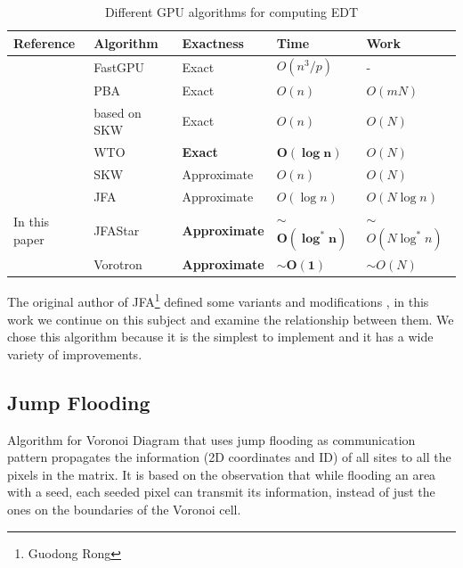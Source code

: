 \documentclass[format=acmsmall,screen,review,authordraft,nonacm]{acmart}
\newcommand{\ourjfasingle}{JFAStar}
\newcommand{\ourjfa}{Vorotron} %
\begin{document}
\begin{table}[H] \centering
\begin{tabular}{@{}lllll@{}}
\toprule
\textbf{Reference}                & \textbf{Algorithm}    & \textbf{Exactness}
	& \textbf{Time}         & \textbf{Work}         \\ \midrule
\citep{de2017fast}       & FastGPU      & Exact       & $O(n^3/p)$   & -            \\
\citep{cao2010parallel}  & PBA          & Exact       & $O(n)$       & $O(mN)$      \\
\citep{honda2017simple}  & based on SKW & Exact       & $O(n)$       & $O(N)$       \\
\citep{manduhu2019work}  & WTO          & \cellcolor{blue!25}\textbf{Exact}&
	\cellcolor{blue!25}$\mathbf{O(\log n)}$  & $O(N)$       \\
\citep{schneider2009gpu} & SKW          & Approximate & $O(n)$       & $O(N)$       \\
\citep{rong2006jump}     & JFA          & Approximate & $O(\log n)$  & $O(N\log n)$ \\ \bottomrule
In this paper            & \ourjfasingle&
	\cellcolor{blue!25}\textbf{Approximate} &
	\cellcolor{blue!25}$\sim$$\mathbf{O(\log^{\ast} n)}$ & $\sim$$O(N\log^{\ast} n)$ \\
                         & \ourjfa      &
	\cellcolor{blue!25}\textbf{Approximate} &
	\cellcolor{blue!25}$\sim$$\mathbf{O(1)}$ & $\sim$$O(N)$ \\
\bottomrule
\end{tabular}
\vspace{1em}
\caption{Different GPU algorithms for computing EDT}
\end{table}

The original author of JFA\footnote{Guodong Rong} defined some variants and
modifications \citep{rong2007variants}, in this work we continue on this subject
and examine the relationship between them.
We chose this algorithm because it is the simplest to implement and it has a wide variety of improvements.


\subsection{Jump Flooding} %

Algorithm for Voronoi Diagram that uses jump flooding as communication pattern
propagates the information (2D coordinates and ID) of all sites to all the
pixels in the matrix.  It is based on the observation that while flooding an
area with a seed, each seeded pixel can transmit its information, instead of
just the ones on the boundaries of the Voronoi cell.
\end{document}
